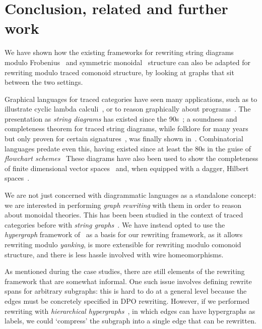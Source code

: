 \section{Conclusion, related and further work}

We have shown how the existing frameworks for rewriting string diagrams modulo
Frobenius~\cite{bonchi2022string} and symmetric
monoidal~\cite{bonchi2022stringa} structure can also be adapted for rewriting
modulo traced comonoid structure, by looking at graphs that sit between
the two settings.

Graphical languages for traced categories have seen many applications, such as
to illustrate cyclic lambda calculi~\cite{hasegawa1997recursion}, or to reason
graphically about programs~\cite{schweimeier1999categorical}.
The presentation as \emph{string diagrams} has existed since the
90s~\cite{joyal1991geometry,joyal1996traced}; a soundness and completeness
theorem for traced string diagrams, while folklore for many years but only
proven for certain signatures~\cite{selinger2011survey}, was finally shown
in~\cite{kissinger2014abstract}.
Combinatorial languages predate even this, having existed since at least the 80s
in the guise of
\emph{flowchart schemes}~\cite{stefanescu1990feedback,cazanescu1990new,cazanescu1994feedback}
These diagrams have also been used to show the completeness of finite dimensional
vector spaces~\cite{hasegawa2008finite} and, when equipped with a dagger,
Hilbert spaces~\cite{selinger2012finite}.

We are not just concerned with diagrammatic languages as a standalone concept:
we are interested in performing \emph{graph rewriting} with them in order to
reason about monoidal theories.
This has been been studied in the context of traced categories before with
\emph{string graphs}~\cite{kissinger2012pictures,dixon2013opengraphs}.
We have instead opted to use the \emph{hypergraph} framework
of~\cite{bonchi2022string,bonchi2022stringa,bonchi2022stringb} as a basis for our
rewriting framework, as it allows rewriting modulo \emph{yanking}, is more
extensible for rewriting modulo comonoid structure, and there is less hassle
involved with wire homeomorphisms.

As mentioned during the case studies, there are still elements of the rewriting
framework that are somewhat informal.
One such issue involves defining rewrite spans for arbitrary subgraphs: this is
hard to do at a general level because the edges must be concretely specified in
DPO rewriting.
However, if we performed rewriting with
\emph{hierarchical hypergraphs}~\cite{alvarez-picallo2021functorial}, in
which edges can have hypergraphs as labels, we could `compress' the subgraph
into a single edge that can be rewritten.

